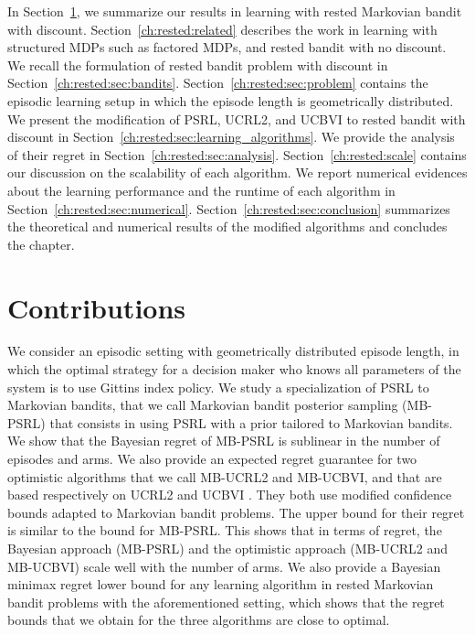 In Section~\ref{ch:rested:sec:contribute}, we summarize our results in learning with rested Markovian bandit with discount.
Section~\ref{ch:rested:related} describes the work in learning with structured MDPs such as factored MDPs, and rested bandit with no discount.
We recall the formulation of rested bandit problem with discount in Section~\ref{ch:rested:sec:bandits}.
Section~\ref{ch:rested:sec:problem} contains the episodic learning setup in which the episode length is geometrically distributed.
We present the modification of PSRL, UCRL2, and UCBVI to rested bandit with discount in Section~\ref{ch:rested:sec:learning_algorithms}.
We provide the analysis of their regret in Section~\ref{ch:rested:sec:analysis}.
Section~\ref{ch:rested:scale} contains our discussion on the scalability of each algorithm.
We report numerical evidences about the learning performance and the runtime of each algorithm in Section~\ref{ch:rested:sec:numerical}.
Section~\ref{ch:rested:sec:conclusion} summarizes the theoretical and numerical results of the modified algorithms and concludes the chapter.

\section{Contributions}
\label{ch:rested:sec:contribute}

We consider an episodic setting with geometrically distributed episode length, in which the optimal strategy for a decision maker who knows all parameters of the system is to use Gittins index policy. We study a specialization of PSRL \cite{osband2013more} to Markovian bandits, that we call Markovian bandit posterior sampling (MB-PSRL) that consists in using PSRL with a prior tailored to Markovian bandits. We show that the Bayesian regret of MB-PSRL is sublinear in the number of episodes and arms. We also provide an expected regret guarantee for two optimistic algorithms that we call MB-UCRL2 and MB-UCBVI, and that are based respectively on UCRL2 \cite{jaksch2010near} and UCBVI \cite{azar2017minimax}. They both use modified  confidence bounds adapted to Markovian bandit problems. The upper bound for their regret is similar to the bound for MB-PSRL. This shows that in terms of regret, the Bayesian approach (MB-PSRL) and the optimistic approach (MB-UCRL2 and MB-UCBVI) scale well with the number of arms. We also provide a Bayesian minimax regret lower bound for any learning algorithm in rested Markovian bandit problems with the aforementioned setting, which shows that the regret bounds that we obtain for the three algorithms are close to optimal.

